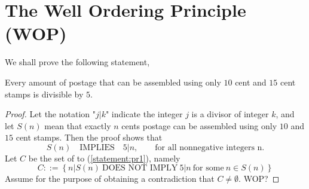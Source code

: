 \chapter{The Well Ordering Principle (WOP)}

\begin{pr}
    We shall prove the following statement,
    \begin{lemPr}
        Every amount of postage that can be assembled using only $10$ cent
        and $15$ cent stamps is divisible by $5$.
    \end{lemPr}

    \begin{proof}
        Let the notation "$j\left|\right.k$" indicate the integer $j$
        is a divisor of integer $k$, and let $S(n)$ mean that exactly $n$ cents
        postage can be assembled using only $10$ and $15$ cent stamps. Then
        the proof shows that
        \begin{equation} \label{statement:pr1}
            S(n) \quad \text{IMPLIES} \quad 5 \left|\right. n, \qquad \text{for all nonnegative integers n.}
        \end{equation}
        Let $C$ be the set of  to (\ref{statement:pr1}), namely
        \begin{equation*}
            C ::= \left\{ n \left|\right. S(n) \ \text{DOES NOT IMPLY} \ 5 \left|\right. n \ \text{for some} \ n \in S(n) \right\}
        \end{equation*}
        Assume for the purpose of obtaining a contradiction that $C \neq \emptyset$.
        WOP?
    \end{proof}
\end{pr}
